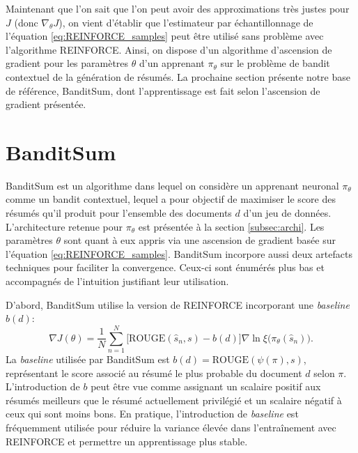 Maintenant que l'on sait que l'on peut avoir des approximations très justes pour
$J$ (donc $\nabla_\theta J$), on vient d'établir que l'estimateur par échantillonnage 
de l'équation \eqref{eq:REINFORCE_samples} peut être utilisé sans problème 
avec l'algorithme REINFORCE.
Ainsi, on dispose d'un algorithme d'ascension de gradient pour les paramètres
 $\theta$ d'un apprenant $\pi_\theta$ sur le problème de bandit contextuel
 de la génération de résumés.
La prochaine section présente notre base de référence, BanditSum, 
dont l'apprentissage est fait selon l'ascension de gradient présentée.

\section{BanditSum}

BanditSum est un algorithme dans lequel on considère un apprenant neuronal $\pi_\theta$ 
comme un bandit contextuel,
lequel a pour objectif de maximiser le score des résumés qu'il produit pour l'ensemble 
des documents $d$ d'un jeu de données.
L'architecture retenue pour $\pi_\theta$ est présentée à la section \ref{subsec:archi}.
Les paramètres $\theta$ sont quant à eux appris via une ascension de gradient 
basée sur l'équation \eqref{eq:REINFORCE_samples}.
BanditSum incorpore aussi deux artefacts techniques pour faciliter la convergence.
Ceux-ci sont énumérés plus bas et accompagnés de l'intuition justifiant leur 
utilisation.

D'abord, BanditSum utilise la version de REINFORCE incorporant une \textit{baseline} $b(d)$:
\begin{equation}
    \nabla J(\theta) = \frac{1}{N} \sum_{n=1}^N\big[\text{ROUGE}(\hat{s}_n, s) - b(d)\big]\nabla \ln \xi\big(\pi_\theta (\hat{s}_n)\big).
    \label{eq:REINFORCE_baseline}
\end{equation}
La \textit{baseline} utilisée par BanditSum est $b(d) = \text{ROUGE}\left(\psi(\pi), s\right)$, représentant le score associé au résumé
le plus probable du document $d$ selon $\pi$.
L'introduction de $b$ peut être vue comme assignant un scalaire positif 
aux résumés meilleurs que le résumé actuellement privilégié et un scalaire négatif à ceux qui 
sont moins bons.
En pratique, l'introduction de \textit{baseline} est fréquemment utilisée pour réduire la variance 
élevée dans l'entraînement avec REINFORCE et permettre un apprentissage plus stable.

